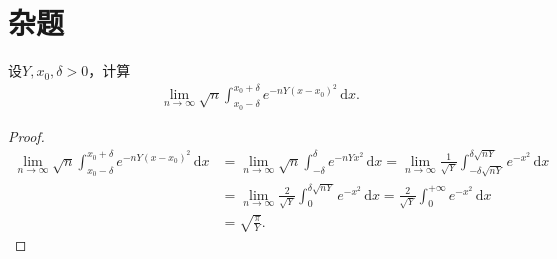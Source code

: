 \documentclass[../../main.tex]{subfiles}
\begin{document}
\section{杂题}

\begin{example}
设$Y,x_0,\delta > 0$，计算
\begin{align*}
\lim_{n \to \infty} \sqrt{n} \int_{x_0 - \delta}^{x_0 + \delta} e^{-nY(x - x_0)^2} \,\mathrm{d}x.
\end{align*}
\end{example}
\begin{proof}
\begin{align*}
\underset{n\rightarrow \infty}{\lim}\sqrt{n}\int_{x_0-\delta}^{x_0+\delta}{e^{-nY(x-x_0)^2}\,\mathrm{d}x}&=\underset{n\rightarrow \infty}{\lim}\sqrt{n}\int_{-\delta}^{\delta}{e^{-nYx^2}\,\mathrm{d}x}=\underset{n\rightarrow \infty}{\lim}\frac{1}{\sqrt{Y}}\int_{-\delta \sqrt{nY}}^{\delta \sqrt{nY}}{e^{-x^2}\,\mathrm{d}x}
\\
&=\underset{n\rightarrow \infty}{\lim}\frac{2}{\sqrt{Y}}\int_0^{\delta \sqrt{nY}}{e^{-x^2}\,\mathrm{d}x}=\frac{2}{\sqrt{Y}}\int_0^{+\infty}{e^{-x^2}\,\mathrm{d}x}
\\
&=\sqrt{\frac{\pi}{Y}}.
\end{align*}

\end{proof}
\end{document}
